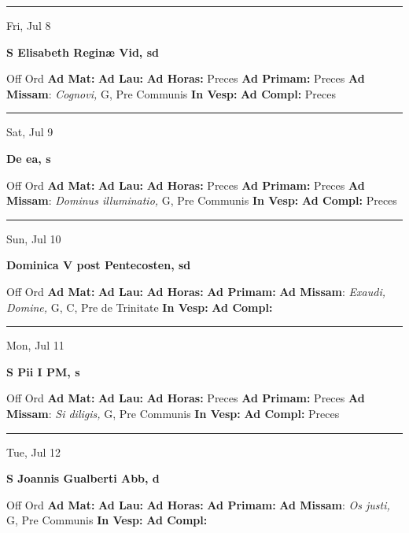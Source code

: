 \documentclass[letterpaper, 10pt]{article}
\begin{document}
\hrule
\begin{center}
Fri, Jul 8
\end{center}\textbf{ \large S Elisabeth Reginæ Vid, \textnormal{\normalsize sd}}
\begin{justify}
Off Ord
\textbf{Ad Mat: }
\textbf{Ad Lau: }
\textbf{Ad Horas: }Preces
\textbf{Ad Primam: }Preces
\textbf{Ad Missam}: \textit{Cognovi,} G, Pre Communis
\textbf{In Vesp: }
\textbf{Ad Compl: }Preces\end{justify}



\hrule
\begin{center}
Sat, Jul 9
\end{center}\textbf{ \large De ea, \textnormal{\normalsize s}}
\begin{justify}
Off Ord
\textbf{Ad Mat: }
\textbf{Ad Lau: }
\textbf{Ad Horas: }Preces
\textbf{Ad Primam: }Preces
\textbf{Ad Missam}: \textit{Dominus illuminatio,} G, Pre Communis
\textbf{In Vesp: }
\textbf{Ad Compl: }Preces\end{justify}



\hrule
\begin{center}
Sun, Jul 10
\end{center}\textbf{ \large Dominica V post Pentecosten, \textnormal{\normalsize sd}}
\begin{justify}
Off Ord
\textbf{Ad Mat: }
\textbf{Ad Lau: }
\textbf{Ad Horas: }
\textbf{Ad Primam: }
\textbf{Ad Missam}: \textit{Exaudi, Domine,} G, C, Pre de Trinitate
\textbf{In Vesp: }
\textbf{Ad Compl: }\end{justify}



\hrule
\begin{center}
Mon, Jul 11
\end{center}\textbf{ \large S Pii I PM, \textnormal{\normalsize s}}
\begin{justify}
Off Ord
\textbf{Ad Mat: }
\textbf{Ad Lau: }
\textbf{Ad Horas: }Preces
\textbf{Ad Primam: }Preces
\textbf{Ad Missam}: \textit{Si diligis,} G, Pre Communis
\textbf{In Vesp: }
\textbf{Ad Compl: }Preces\end{justify}



\hrule
\begin{center}
Tue, Jul 12
\end{center}\textbf{ \large S Joannis Gualberti Abb, \textnormal{\normalsize d}}
\begin{justify}
Off Ord
\textbf{Ad Mat: }
\textbf{Ad Lau: }
\textbf{Ad Horas: }
\textbf{Ad Primam: }
\textbf{Ad Missam}: \textit{Os justi,} G, Pre Communis
\textbf{In Vesp: }
\textbf{Ad Compl: }\end{justify}
\end{document}
